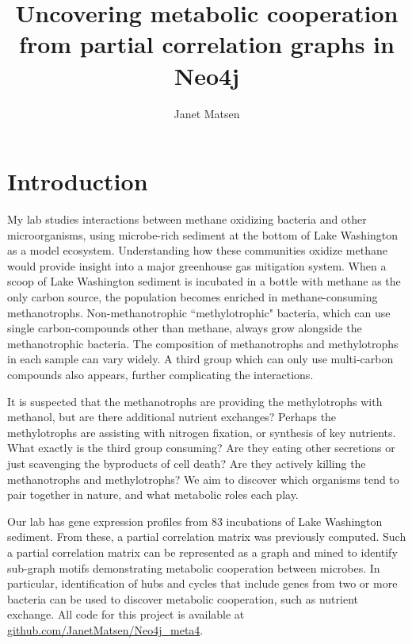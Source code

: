 \documentclass[12pt]{article}
\begin{document}
 
\title{Uncovering metabolic cooperation from partial correlation graphs in Neo4j}
\author{Janet Matsen}
\maketitle

\section{Introduction} %

My lab studies interactions between methane oxidizing bacteria and other microorganisms, using microbe-rich sediment at the bottom of Lake Washington as a model ecosystem. 
Understanding how these communities oxidize methane would provide insight into a major greenhouse gas mitigation system. 
When a scoop of Lake Washington sediment is incubated in a bottle with methane as the only carbon source, the population becomes enriched in methane-consuming methanotrophs.
Non-methanotrophic ``methylotrophic" bacteria, which can use single carbon-compounds other than methane, always grow alongside the methanotrophic bacteria.
The composition of methanotrophs and methylotrophs in each sample can vary widely.
A third group which can only use multi-carbon compounds also appears, further complicating the interactions.

It is suspected that the methanotrophs are providing the methylotrophs with methanol, but are there additional nutrient exchanges?
Perhaps the methylotrophs are assisting with nitrogen fixation, or synthesis of key nutrients. 
What exactly is the third group consuming?  
Are they eating other secretions or just scavenging the byproducts of cell death?
Are they actively killing the methanotrophs and methylotrophs?
We aim to discover which organisms tend to pair together in nature, and what metabolic roles each play. 

Our lab has gene expression profiles from 83 incubations of Lake Washington sediment. 
From these, a partial correlation matrix was previously computed. 
Such a partial correlation matrix can be represented as a graph and mined to identify sub-graph motifs demonstrating metabolic cooperation between microbes. 
In particular, identification of hubs and cycles that include genes from two or more bacteria can be used to discover metabolic cooperation, such as nutrient exchange. 
All code for this project is available at \href{https://github.com/JanetMatsen/Neo4j_meta4}{github.com/JanetMatsen/Neo4j\_meta4}.
\end{document}
